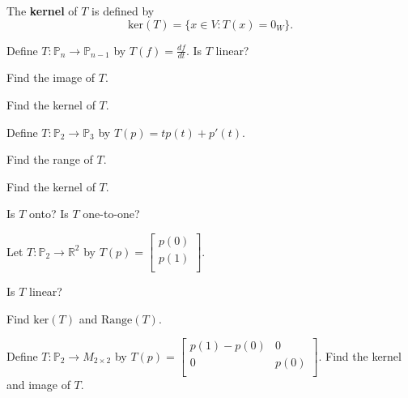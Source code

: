 \documentclass[12pt,letterpaper]{article}
\begin{document}
\begin{enumerate}
\begin{defn}
	The {\bf kernel} of $T$ is defined by $$\text{ker}(T)=\{ x \in V: T(x)=0_W\}.$$
\end{defn}

\Problem Define $T: \mathbb{P}_n \to \mathbb{P}_{n-1}$ by $T(f)=\frac{df}{dt}$.
\Part Is $T$ linear?

\vfill

\Part Find the image of $T$.

\vfill

\Part Find the kernel of $T$.

\vfill

\newpage

\Problem Define $T: \mathbb{P}_2 \to \mathbb{P}_3$ by $T(p)=t p(t)+p'(t)$.

\Part Find the range of $T$.

\vfill

\Part Find the kernel of $T$.

\vfill 

\Part Is $T$ onto? Is $T$ one-to-one?

\vfill

\newpage

\Problem Let $T: \mathbb{P}_2 \to \mathbb{R}^2$ by $T(p)=\begin{bmatrix} p(0)\\ p(1)\\ \end{bmatrix}$.

\Part Is $T$ linear?

\vfill

\Part Find $\text{ker}(T)$ and $\text{Range}(T)$.

\vfill 

\newpage

\Problem Define $T: \mathbb{P}_2 \to M_{2 \times2 }$ by $T(p)=\begin{bmatrix}
p(1)-p(0) & 0\\
0 & p(0)\\
\end{bmatrix}$. Find the kernel and image of $T$.

\end{enumerate}
\end{document}
